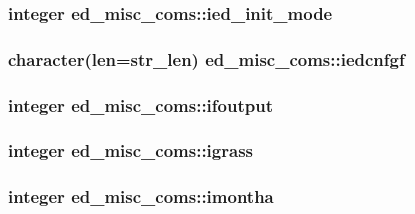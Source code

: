 \subsubsection[{ied\+\_\+init\+\_\+mode}]{\setlength{\rightskip}{0pt plus 5cm}integer ed\+\_\+misc\+\_\+coms\+::ied\+\_\+init\+\_\+mode}\label{namespaceed__misc__coms_a3fe966618b90f36dbd7502084aa70ea4}
\hypertarget{namespaceed__misc__coms_af3a616393e9f54c5d4f173675475e3bf}{}
\subsubsection[{iedcnfgf}]{\setlength{\rightskip}{0pt plus 5cm}character(len=str\+\_\+len) ed\+\_\+misc\+\_\+coms\+::iedcnfgf}\label{namespaceed__misc__coms_af3a616393e9f54c5d4f173675475e3bf}
\hypertarget{namespaceed__misc__coms_a046bda1132eb5f39c1fe39ca6508b1ca}{}
\subsubsection[{ifoutput}]{\setlength{\rightskip}{0pt plus 5cm}integer ed\+\_\+misc\+\_\+coms\+::ifoutput}\label{namespaceed__misc__coms_a046bda1132eb5f39c1fe39ca6508b1ca}
\hypertarget{namespaceed__misc__coms_a6494bf5748198e80e5a1af43ec3f497f}{}
\subsubsection[{igrass}]{\setlength{\rightskip}{0pt plus 5cm}integer ed\+\_\+misc\+\_\+coms\+::igrass}\label{namespaceed__misc__coms_a6494bf5748198e80e5a1af43ec3f497f}
\hypertarget{namespaceed__misc__coms_a77a981fafd63a7d95ae3c331a43383dd}{}
\subsubsection[{imontha}]{\setlength{\rightskip}{0pt plus 5cm}integer ed\+\_\+misc\+\_\+coms\+::imontha}\label{namespaceed__misc__coms_a77a981fafd63a7d95ae3c331a43383dd}
\hypertarget{namespaceed__misc__coms_acd8c94d7731ef2f85c4c39dea743ba84}{}
